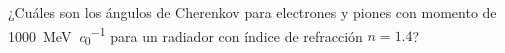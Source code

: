 \documentclass[./../main.tex]{subfiles}
\begin{document}
	\begin{exercise}
		¿Cuáles son los ángulos de Cherenkov para electrones y piones con momento de \qty{1000}{\MeV\per\clight} para un radiador con índice de refracción \(n = 1.4\)?
	\end{exercise}
\end{document}
